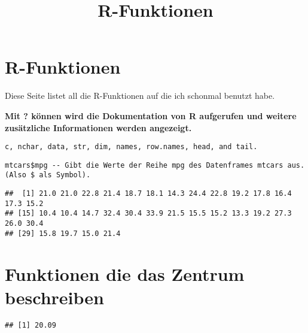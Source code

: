 \documentclass[]{article}
\title{R-Funktionen}
\author{}
\date{}
\newenvironment{Shaded}{\begin{snugshade}}{\end{snugshade}}
\newcommand{\KeywordTok}[1]{\textcolor[rgb]{0.94,0.87,0.69}{{#1}}}
\newcommand{\CommentTok}[1]{\textcolor[rgb]{0.50,0.62,0.50}{{#1}}}
\newcommand{\NormalTok}[1]{\textcolor[rgb]{0.80,0.80,0.80}{{#1}}}
\begin{document}
\maketitle


\section{R-Funktionen}\label{r-funktionen}

Diese Seite listet all die R-Funktionen auf die ich schonmal benutzt
habe.

\textbf{Mit ? können wird die Dokumentation von R aufgerufen und weitere
zusätzliche Informationen werden angezeigt.}

\begin{verbatim}
c, nchar, data, str, dim, names, row.names, head, and tail.
\end{verbatim}

\begin{verbatim}
mtcars$mpg -- Gibt die Werte der Reihe mpg des Datenframes mtcars aus. (Also $ als Symbol).
\end{verbatim}

\begin{Shaded}
\end{Shaded}

\begin{verbatim}
##  [1] 21.0 21.0 22.8 21.4 18.7 18.1 14.3 24.4 22.8 19.2 17.8 16.4 17.3 15.2
## [15] 10.4 10.4 14.7 32.4 30.4 33.9 21.5 15.5 15.2 13.3 19.2 27.3 26.0 30.4
## [29] 15.8 19.7 15.0 21.4
\end{verbatim}

\section{Funktionen die das Zentrum
beschreiben}\label{funktionen-die-das-zentrum-beschreiben}

\begin{Shaded}
\end{Shaded}

\begin{verbatim}
## [1] 20.09
\end{verbatim}
\end{document}
